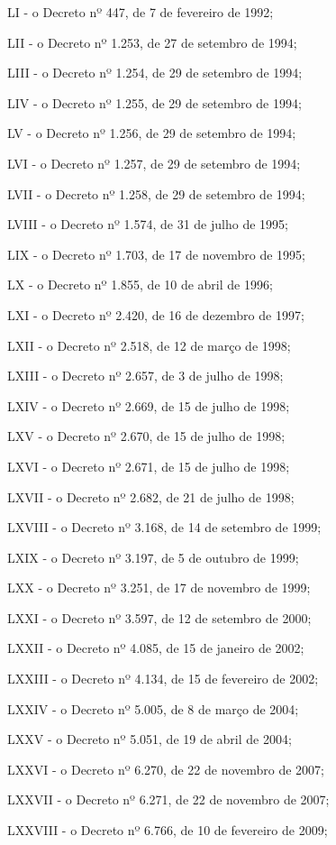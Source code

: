 \documentclass[
]{book}
\begin{document}
LI - o Decreto nº 447, de 7 de fevereiro de 1992;

LII - o Decreto nº 1.253, de 27 de setembro de 1994;

LIII - o Decreto nº 1.254, de 29 de setembro de 1994;

LIV - o Decreto nº 1.255, de 29 de setembro de 1994;

LV - o Decreto nº 1.256, de 29 de setembro de 1994;

LVI - o Decreto nº 1.257, de 29 de setembro de 1994;

LVII - o Decreto nº 1.258, de 29 de setembro de 1994;

LVIII - o Decreto nº 1.574, de 31 de julho de 1995;

LIX - o Decreto nº 1.703, de 17 de novembro de 1995;

LX - o Decreto nº 1.855, de 10 de abril de 1996;

LXI - o Decreto nº 2.420, de 16 de dezembro de 1997;

LXII - o Decreto nº 2.518, de 12 de março de 1998;

LXIII - o Decreto nº 2.657, de 3 de julho de 1998;

LXIV - o Decreto nº 2.669, de 15 de julho de 1998;

LXV - o Decreto nº 2.670, de 15 de julho de 1998;

LXVI - o Decreto nº 2.671, de 15 de julho de 1998;

LXVII - o Decreto nº 2.682, de 21 de julho de 1998;

LXVIII - o Decreto nº 3.168, de 14 de setembro de 1999;

LXIX - o Decreto nº 3.197, de 5 de outubro de 1999;

LXX - o Decreto nº 3.251, de 17 de novembro de 1999;

LXXI - o Decreto nº 3.597, de 12 de setembro de 2000;

LXXII - o Decreto nº 4.085, de 15 de janeiro de 2002;

LXXIII - o Decreto nº 4.134, de 15 de fevereiro de 2002;

LXXIV - o Decreto nº 5.005, de 8 de março de 2004;

LXXV - o Decreto nº 5.051, de 19 de abril de 2004;

LXXVI - o Decreto nº 6.270, de 22 de novembro de 2007;

LXXVII - o Decreto nº 6.271, de 22 de novembro de 2007;

LXXVIII - o Decreto nº 6.766, de 10 de fevereiro de 2009;
\end{document}
